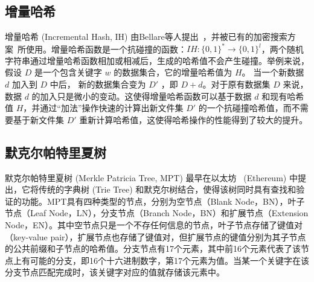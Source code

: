 \subsection{增量哈希}
增量哈希 (Incremental Hash, IH) 由Bellare等人提出~\cite{bellare1994incremental}，并被已有的加密搜索方案~\cite{kamara2011cs2}所使用。增量哈希函数是一个抗碰撞的函数：$IH: \{0,1\}^* \rightarrow \{0,1\}^l$，两个随机字符串通过增量哈希函数相加或相减后，生成的哈希值不会产生碰撞。举例来说，假设 $D$ 是一个包含关键字 $w$ 的数据集合，它的增量哈希值为 $H$。 当一个新数据 $d$ 加入到 $D$ 中后， 新的数据集合变为 $D'$ ，即 $D+d$。对于原有数据集 $D$ 来说，数据 $d$ 的加入只是微小的变动。这使得增量哈希函数可以基于数据 $d$ 和现有哈希值 $H$，并通过“加法”操作快速的计算出新文件集 $D'$ 的一个抗碰撞哈希值，而不需要基于新文件集 $D'$ 重新计算哈希值，这使得哈希操作的性能得到了较大的提升。


\subsection{默克尔帕特里夏树}
默克尔帕特里夏树 (Merkle Patricia Tree, MPT) 最早在以太坊~ \cite{wood2014ethereum, merkle_patricia_tree} (Ethereum) 中提出，它将传统的字典树 (Trie Tree) 和默克尔树结合，使得该树同时具有查找和验证的功能。MPT具有四种类型的节点，分别为空节点（Blank Node，BN），叶子节点（Leaf Node，LN），分支节点（Branch Node，BN）和扩展节点（Extension Node，EN）。其中空节点只是一个不存任何信息的节点，叶子节点存储了键值对（key-value pair），扩展节点也存储了键值对，但扩展节点的键值分别为其子节点的公共前缀和子节点的哈希值。分支节点有17个元素，其中前16个元素代表了该节点上有可能的分支，即16个十六进制数字，第17个元素为值。当某一个关键字在该分支节点匹配完成时，该关键字对应的值就存储该元素中。

